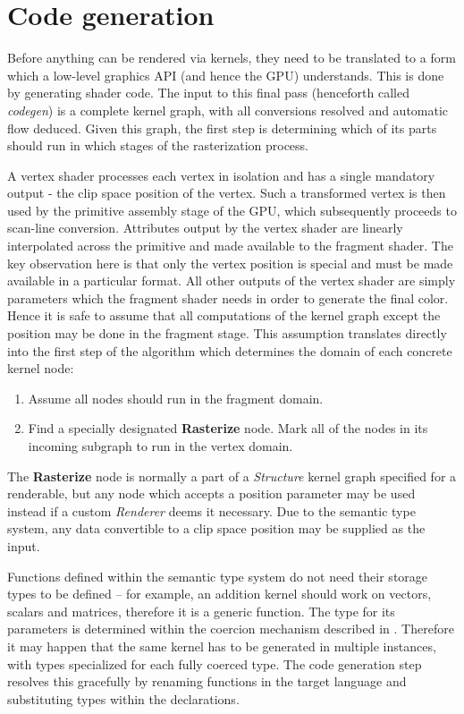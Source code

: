 \section{Code generation}
\label{sec:codegen}

Before anything can be rendered via kernels, they need to be translated to a form which a low-level graphics API (and hence the GPU) understands. This is done by generating shader code. The input to this final pass (henceforth called \emph{codegen}) is a complete kernel graph, with all conversions resolved and automatic flow deduced. Given this graph, the first step is determining which of its parts should run in which stages of the rasterization process.

A vertex shader processes each vertex in isolation and has a single mandatory output - the clip space position of the vertex. Such a transformed vertex is then used by the primitive assembly stage of the GPU, which subsequently proceeds to scan-line conversion. Attributes output by the vertex shader are linearly interpolated across the primitive and made available to the fragment shader. The key observation here is that only the vertex position is special and must be made available in a particular format. All other outputs of the vertex shader are simply parameters which the fragment shader needs in order to generate the final color. Hence it is safe to assume that all computations of the kernel graph except the position may be done in the fragment stage. This assumption translates directly into the first step of the algorithm which determines the domain of each concrete kernel node:

\begin{enumerate}
\item Assume all nodes should run in the fragment domain.
\item Find a specially designated \textbf{Rasterize} node. Mark all of the nodes in its incoming subgraph to run in the vertex domain.
\end{enumerate}

The \textbf{Rasterize} node is normally a part of a \emph{Structure} kernel graph specified for a renderable, but any node which accepts a position parameter may be used instead if a custom \emph{Renderer} deems it necessary. Due to the semantic type system, any data convertible to a clip space position may be supplied as the input.

Functions defined within the semantic type system do not need their storage types to be defined -- for example, an addition kernel should work on vectors, scalars and matrices, therefore it is a generic function. The type for its parameters is determined within the coercion mechanism described in . Therefore it may happen that the same kernel has to be generated in multiple instances, with types specialized for each fully coerced type. The code generation step resolves this gracefully by renaming functions in the target language and substituting types within the declarations.

